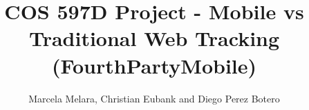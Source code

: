 \documentclass{acm_proc_article-sp}
\begin{document}
\newcommand{\pp}{privacy policy }
\newcommand{\pps}{privacy policies }
\newcommand{\fpm}{FourthPartyMobile }

\title{COS 597D Project - Mobile vs Traditional Web Tracking\\(FourthPartyMobile)}
%
%
%
%
%

%
\author{
%
%
\alignauthor
Marcela Melara, Christian Eubank and Diego Perez Botero \\ 
}

\maketitle

\end{document}
